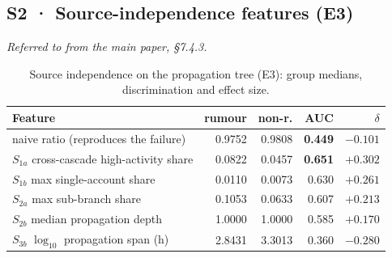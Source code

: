 \subsection*{S2 · Source-independence features (E3)}
\noindent\emph{Referred to from the main paper, \S7.4.3.}

\begin{table}[htbp]
\caption{Source independence on the propagation tree (E3): group medians,
discrimination and effect size.}
\label{stab:independence}
\centering
\scriptsize
\renewcommand{\arraystretch}{1.14}
\begin{tabular}{@{}lrrrr@{}}
\toprule
\textbf{Feature} & \textbf{rumour} & \textbf{non-r.} & \textbf{AUC} & \textbf{$\delta$}\\
\midrule
naive ratio (reproduces the failure) & 0.9752 & 0.9808 & \textbf{0.449} & $-0.101$\\
$S_{1a}$ cross-cascade high-activity share & 0.0822 & 0.0457 & \textbf{0.651} & $+0.302$\\
$S_{1b}$ max single-account share & 0.0110 & 0.0073 & 0.630 & $+0.261$\\
$S_{2a}$ max sub-branch share & 0.1053 & 0.0633 & 0.607 & $+0.213$\\
$S_{2b}$ median propagation depth & 1.0000 & 1.0000 & 0.585 & $+0.170$\\
$S_{3b}$ $\log_{10}$ propagation span (h) & 2.8431 & 3.3013 & 0.360 & $-0.280$\\
\bottomrule
\end{tabular}
\end{table}
